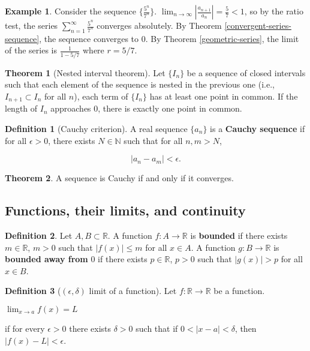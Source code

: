 \documentclass{article}
\theoremstyle{definition}
\newtheorem{definition}{Definition}[section]
\newtheorem{example}{Example}[section]
\newtheorem{theorem}{Theorem}[section]
\begin{document}
\begin{example}
Consider the sequence $\{\frac{5^n}{7^n}\}$. $\lim_{n \to \infty} |\frac{a_{n+1}}{a_n}| = \frac{5}{7} < 1$, so by the ratio test, the series $\sum\limits_{n=1}^\infty \frac{5^n}{7^n}$ converges absolutely. By Theorem \ref{convergent-series-sequence}, the sequence converges to 0. By Theorem \ref{geometric-series}, the limit of the series is $\frac{1}{1-5/7}$ where $r = 5/7$.
\end{example}

\begin{theorem}[Nested interval theorem]
Let $\{I_n\}$ be a sequence of closed intervals such that each element of the sequence is nested in the previous one (i.e., $I_{n+1} \subset I_n$ for all $n$), each term of $\{I_n\}$ has at least one point in common. If the length of $I_n$ approaches 0, there is exactly one point in common.
\end{theorem}

\begin{definition}[Cauchy criterion]
A real sequence $\{a_n\}$ is a \textbf{Cauchy sequence} if for all $\epsilon > 0$, there exists $N \in \mathbb{N}$ such that for all $n, m > N$, 

\begin{equation*}
|a_n - a_m| < \epsilon.
\end{equation*}
\end{definition}

\begin{theorem}
A sequence is Cauchy if and only if it converges.
\end{theorem}

\subsection{Functions, their limits, and continuity}

\begin{definition}
Let $A, B \subset \mathbb{R}$. A function $f: A \to \mathbb{R}$ is \textbf{bounded} if there exists $m \in \mathbb{R}$, $m > 0$ such that $|f(x)| \leq m$ for all $x \in A$. A function $g: B \to \mathbb{R}$ is \textbf{bounded away from} 0 if there exists $p \in \mathbb{R}$, $p > 0$ such that $|g(x)| > p$ for all $x \in B$. 
\end{definition}
\begin{definition}[$(\epsilon, \delta)$ limit of a function]

Let $f: \mathbb{R} \to \mathbb{R}$ be a function. 

\begin{center}
$\lim_{x \to a} f(x) = L$
\end{center}

if for every $\epsilon > 0$ there exists $\delta > 0$ such that if $0 < |x-a| <
\delta$, then $|f(x) - L| < \epsilon$.
 
\end{definition}
\end{document}
